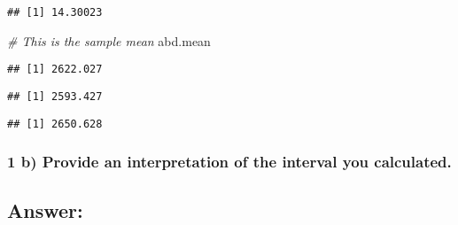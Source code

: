 \documentclass[]{article}
\newenvironment{Shaded}{\begin{snugshade}}{\end{snugshade}}
\newcommand{\DecValTok}[1]{\textcolor[rgb]{0.00,0.00,0.81}{#1}}
\newcommand{\StringTok}[1]{\textcolor[rgb]{0.31,0.60,0.02}{#1}}
\newcommand{\CommentTok}[1]{\textcolor[rgb]{0.56,0.35,0.01}{\textit{#1}}}
\newcommand{\OperatorTok}[1]{\textcolor[rgb]{0.81,0.36,0.00}{\textbf{#1}}}
\newcommand{\NormalTok}[1]{#1}
\begin{document}
\begin{verbatim}
## [1] 14.30023
\end{verbatim}

\begin{Shaded}
\begin{Highlighting}[]
\CommentTok{# This is the sample mean}
\NormalTok{abd.mean}
\end{Highlighting}
\end{Shaded}

\begin{verbatim}
## [1] 2622.027
\end{verbatim}

\begin{Shaded}
\end{Shaded}

\begin{verbatim}
## [1] 2593.427
\end{verbatim}

\begin{Shaded}
\end{Shaded}

\begin{verbatim}
## [1] 2650.628
\end{verbatim}

\subsubsection{1 b) Provide an interpretation of the interval you
calculated.}\label{b-provide-an-interpretation-of-the-interval-you-calculated.}

\subsection{Answer:}\label{answer}
\end{document}
